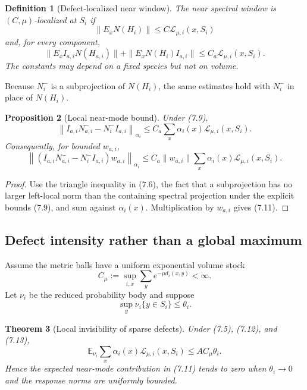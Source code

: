 \documentclass[11pt]{article}
\newtheorem{theorem}{Theorem}[section]
\newtheorem{proposition}[theorem]{Proposition}
\newtheorem{definition}[theorem]{Definition}
\begin{document}
\begin{definition}[Defect-localized near window]
\label{def:v11v7-localized}
The near spectral window is \((C,\mu)\)-localized at \(S_i\) if
\[
 \|E_xN(H_i)\|\leq C\mathcal L_{\mu,i}(x,S_i)
 \tag{7.8}
\]
and, for every component,
\[
 \|E_xI_{a,i}N(H_{a,i})\|
 +
 \|E_xN(H_i)I_{a,i}\|
 \leq C_a\mathcal L_{\mu,i}(x,S_i).
 \tag{7.9}
\]
The constants may depend on a fixed species but not on volume.
\end{definition}

Because \(N_i^-\) is a subprojection of \(N(H_i)\), the same estimates
hold with \(N_i^-\) in place of \(N(H_i)\).

\begin{proposition}[Local near-mode bound]
\label{prop:v11v7-near-bound}
Under (7.9),
\[
 \left\|
 I_{a,i}N_{a,i}^- -N_i^-I_{a,i}
 \right\|_{\alpha_i}
 \leq
 C_a
 \sum_x\alpha_i(x)\mathcal L_{\mu,i}(x,S_i).
 \tag{7.10}
\]
Consequently, for bounded \(w_{a,i}\),
\[
 \left\|
 (I_{a,i}N_{a,i}^- -N_i^-I_{a,i})w_{a,i}
 \right\|_{\alpha_i}
 \leq
 C_a\|w_{a,i}\|
 \sum_x\alpha_i(x)\mathcal L_{\mu,i}(x,S_i).
 \tag{7.11}
\]
\end{proposition}

\begin{proof}
Use the triangle inequality in (7.6), the fact that a subprojection has
no larger left-local norm than the containing spectral projection under
the explicit bounds (7.9), and sum against \(\alpha_i(x)\).
Multiplication by \(w_{a,i}\) gives (7.11).
\end{proof}

\subsection{Defect intensity rather than a global maximum}

Assume the metric balls have a uniform exponential volume stock
\[
 C_\mu:=
 \sup_{i,x}\sum_y e^{-\mu d_i(x,y)}<\infty.
 \tag{7.12}
\]
Let \(\nu_i\) be the reduced probability body and suppose
\[
 \sup_y\nu_i\{y\in S_i\}\leq\theta_i.
 \tag{7.13}
\]

\begin{theorem}[Local invisibility of sparse defects]
\label{thm:v11v7-sparse}
Under (7.5), (7.12), and (7.13),
\[
 \mathbb E_{\nu_i}
 \sum_x\alpha_i(x)\mathcal L_{\mu,i}(x,S_i)
 \leq
 AC_\mu\theta_i.
 \tag{7.14}
\]
Hence the expected near-mode contribution in (7.11) tends to zero when
\(\theta_i\to0\) and the response norms are uniformly bounded.
\end{theorem}
\end{document}
